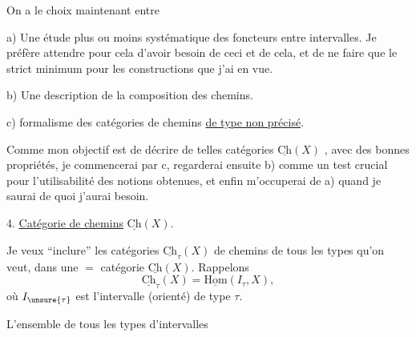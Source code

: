 
On a le choix  maintenant entre

a) Une étude plus ou moins systématique des foncteurs entre intervalles. Je préfère attendre pour cela d'avoir besoin de ceci et de cela, et de ne faire que le strict minimum pour les constructions que j'ai en vue.

b) Une description de la composition des chemins.

c)  formalisme des catégories de chemins \uline{de type non précisé}.

Comme mon objectif est  de décrire de telles catégories $\underline{\mathrm{Ch}}(X)$ , avec des bonnes propriétés, je commencerai par c,  regarderai ensuite b) comme un test crucial pour l'utilisabilité des notions obtenues, et enfin m'occuperai de a) quand je saurai de quoi j'aurai  besoin.

4. \uline{Catégorie de chemins} $\underline{\mathrm{Ch}}(X)$.

Je veux ``inclure''  les catégories $\underline{\mathrm{Ch}}_\tau(X)$ de chemins de tous les types qu'on veut, dans une $=$ catégorie $\underline{\mathrm{Ch}}(X)$. Rappelons
\[ \underline{\mathrm{Ch}}_\tau(X)=\underline{\mathrm{Hom}}(I_\tau,X), \]
où $I_{\unsure{\tau}}$ est l'intervalle (orienté)  de type $\tau$. 

L'ensemble de tous les types d'intervalles
